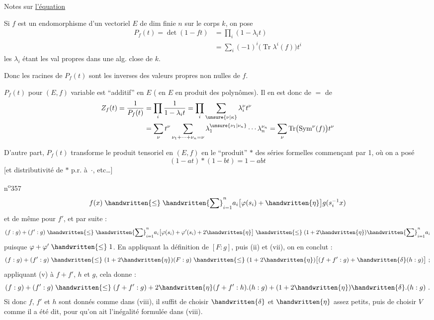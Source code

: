 Notes sur \uline{l'équation }

Si $f$ est un endomorphisme d'un vectoriel $E$ de dim finie $n$ sur le corps $k$, on pose
\[
\begin{aligned}
P_f(t)=\det(1-ft)&=\prod_i(1-\lambda_i t)\\
&=\sum_i(-1)^i\bigl(\operatorname{Tr}\lambda^i(f)\bigr)t^i
\end{aligned}
\]
les $\lambda_i$ étant les val propres dans une  alg. close de $k$.

Donc les racines de $P_f(t)$ sont les inverses des valeurs propres non nulles de $f$.

$P_f(t)$ pour $(E,f)$ variable est ``additif'' en $E$ ( en $E$  en produit des polynômes). Il en est donc de $=$ de
\[
\begin{aligned}
Z_f(t)=\frac{1}{P_f(t)}
 &=\prod_i\frac{1}{1-\lambda_i t}
 =\prod_i\sum_{\unsure{\nu|\kappa}}\lambda_i^\nu t^\nu\\
 &=\sum_\nu t^\nu\sum_{\nu_1+\cdots+\nu_n=\nu}\lambda_1^{\unsure{\nu_1|\nu_n}}\cdots\lambda_n^{\nu_n}
 =\sum_\nu\operatorname{Tr}\bigl(\operatorname{Sym}^\nu(f)\bigr)t^\nu
\end{aligned}
\]

D'autre part, $P_f(t)$ transforme le produit tensoriel en $(E,f)$ en le ``produit'' $\ast$ des séries formelles commençant par 1, où on a posé
\[
(1-at)\ast(1-bt)=1-abt
\]
[et distributivité de $\ast$ p.r. à\ $\cdot$, etc\ldots]

n\textsuperscript{o}357
\[
f(x)\mathrel{\handwritten{\leq}}\handwritten{\sum}_{i=1}^{n}a_i\bigl[\varphi(s_i)+\handwritten{\eta}\bigr]g(s_i^{-1}x)
\]
et de même pour $f'$, et par suite :
\[
(f:g)+(f':g)\mathrel{\handwritten{\leq}}\handwritten{\sum}_{i=1}^{n}a_i\bigl[\varphi(s_i)+\varphi'(s_i)+2\handwritten{\eta}\bigr]\mathrel{\handwritten{\leq}}(1+2\handwritten{\eta})\handwritten{\sum}_{i=1}^{n}a_i
\]
puisque $\varphi+\varphi'\mathrel{\handwritten{\leq}}1$. En appliquant la définition de $[F:g]$, puis (ii) et (vii), on en conclut :
\[
(f:g)+(f':g)\mathrel{\handwritten{\leq}}(1+2\handwritten{\eta})(F:g)\mathrel{\handwritten{\leq}}(1+2\handwritten{\eta})\bigl[(f+f':g)+\handwritten{\delta}(h:g)\bigr]\ ;
\]
appliquant (v) à $f+f'$, $h$ et $g$, cela donne :
\[
(f:g)+(f':g)\mathrel{\handwritten{\leq}}(f+f':g)+2\handwritten{\eta}(f+f':h).(h:g)+(1+2\handwritten{\eta})\handwritten{\delta}.(h:g)\ .
\]
Si donc $f$, $f'$ et $h$ sont donnés comme dans (viii), il suffit de choisir $\handwritten{\delta}$ et $\handwritten{\eta}$ assez petits, puis de choisir $V$ comme il a été dit, pour qu'on ait l'inégalité formulée dans (viii).

